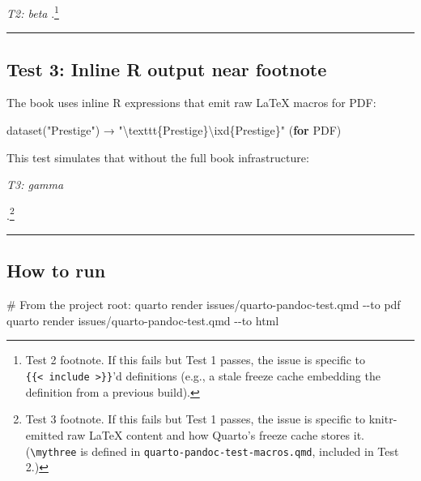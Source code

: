 \documentclass[
  letterpaper,
  DIV=11,
  numbers=noendperiod]{scrartcl}
\newenvironment{Shaded}{\begin{snugshade}}{\end{snugshade}}
\newcommand{\AttributeTok}[1]{\textcolor[rgb]{0.40,0.45,0.13}{#1}}
\newcommand{\CommentTok}[1]{\textcolor[rgb]{0.37,0.37,0.37}{#1}}
\newcommand{\ControlFlowTok}[1]{\textcolor[rgb]{0.00,0.23,0.31}{\textbf{#1}}}
\newcommand{\ExtensionTok}[1]{\textcolor[rgb]{0.00,0.23,0.31}{#1}}
\newcommand{\FunctionTok}[1]{\textcolor[rgb]{0.28,0.35,0.67}{#1}}
\newcommand{\NormalTok}[1]{\textcolor[rgb]{0.00,0.23,0.31}{#1}}
\newcommand{\SpecialCharTok}[1]{\textcolor[rgb]{0.37,0.37,0.37}{#1}}
\newcommand{\StringTok}[1]{\textcolor[rgb]{0.13,0.47,0.30}{#1}}
\begin{document}
\providecommand{\mytwo}[1]{%
  \textit{T2: #1}%
}
\providecommand{\mythree}[1]{%
  \textit{T3: #1}%
}

\mytwo{beta}.\footnote{Test 2 footnote. If this fails but Test 1 passes,
  the issue is specific to
  \texttt{\{\{\textless{}\ include\ \textgreater{}\}\}}'d definitions
  (e.g., a stale freeze cache embedding the definition from a previous
  build).}

\begin{center}\rule{0.5\linewidth}{0.5pt}\end{center}

\subsection{Test 3: Inline R output near footnote}\label{sec-test3}

The book uses inline R expressions that emit raw LaTeX macros for PDF:

\begin{Shaded}
\begin{Highlighting}[]
\FunctionTok{dataset}\NormalTok{(}\StringTok{"Prestige"}\NormalTok{)  →  }\StringTok{"}\SpecialCharTok{\textbackslash{}t}\StringTok{exttt\{Prestige\}\textbackslash{}ixd\{Prestige\}"}\NormalTok{  (}\ControlFlowTok{for}\NormalTok{ PDF)}
\end{Highlighting}
\end{Shaded}

This test simulates that without the full book infrastructure:

\mythree{gamma}

.\footnote{Test 3 footnote. If this fails but Test 1 passes, the issue
  is specific to knitr-emitted raw LaTeX content and how Quarto's freeze
  cache stores it. (\texttt{\textbackslash{}mythree} is defined in
  \texttt{quarto-pandoc-test-macros.qmd}, included in Test 2.)}

\begin{center}\rule{0.5\linewidth}{0.5pt}\end{center}

\subsection{How to run}\label{how-to-run}

\begin{Shaded}
\begin{Highlighting}[]
\CommentTok{\# From the project root:}
\ExtensionTok{quarto}\NormalTok{ render issues/quarto{-}pandoc{-}test.qmd }\AttributeTok{{-}{-}to}\NormalTok{ pdf}
\ExtensionTok{quarto}\NormalTok{ render issues/quarto{-}pandoc{-}test.qmd }\AttributeTok{{-}{-}to}\NormalTok{ html}
\end{Highlighting}
\end{Shaded}
\end{document}
